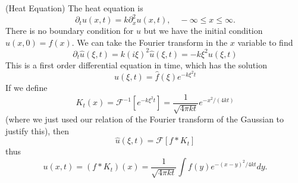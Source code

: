 \begin{ex}{(Heat Equation)}
The heat equation is
\begin{equation}
\partial_{t}u(x,t) =
k\partial_{x}^{2}u(x,t),\quad-\infty\leq x\leq\infty.
\end{equation}
There is no boundary condition for $u$ but we have the
initial condition $u(x,0)=f(x)$. We can take the Fourier
transform in the $x$ variable to find
\begin{equation}
\partial_{t}\widehat{u}(\xi,t) = k(i\xi)^2\widehat{u}(\xi,t)
= -k\xi^{2}u(\xi,t)
\end{equation}
This is a first order differential equation in time, which
has the solution
\begin{equation}
\widehat{u}(\xi,t) = \widehat{f}(\xi)e^{-k\xi^2t}
\end{equation}
If we define
\begin{equation}
K_{t}(x) = \mathcal{F}^{-1}[e^{-k\xi^2t}] =
\frac{1}{\sqrt{4\pi kt}}e^{-x^2/(4kt)}
\end{equation}
(where we just used our relation of the Fourier transform of
the Gaussian to justify this), then
\begin{equation}
\widehat{u}(\xi,t) = \mathcal{F}[f*K_{t}]
\end{equation}
thus
\begin{equation}
u(x,t) = (f*K_{t})(x) = \frac{1}{\sqrt{4\pi kt}}\int f(y)e^{-(x-y)^{2}/4kt}dy.
\end{equation}
\end{ex}
